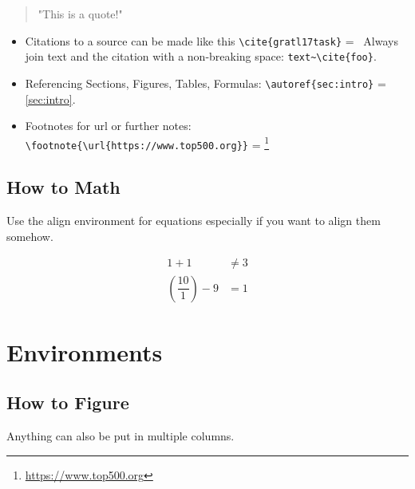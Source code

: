 \documentclass[11pt,
               a4paper,
               bibtotoc,
               idxtotoc,
               headsepline,
               footsepline,
               footexclude,
               BCOR12mm,
               DIV13,
               openany,   %
               ]
               {scrbook}
\begin{document}
\begin{quote}
    "This is a quote!"
\end{quote}

\begin{itemize}
    \item Citations to a source can be made like this \verb|\cite{gratl17task}| =~\cite{gratl17task}
    \subitem Always join text and the citation with a non-breaking space: \verb|text~\cite{foo}|.
    \item Referencing Sections, Figures, Tables, Formulas: \verb|\autoref{sec:intro}| = \autoref{sec:intro}.
    \item Footnotes for url or further notes: \verb|\footnote{\url{https://www.top500.org}}| = \footnote{\url{https://www.top500.org}}
\end{itemize}

\subsection{How to Math}

Use the align environment for equations especially if you want to align them somehow.

\begin{align}
1 + 1 &\ne 3\\
\left(\dfrac{10}{1}\right) - 9 &= 1
\end{align}

\clearpage

\section{Environments}

\subsection{How to Figure}

Anything can also be put in multiple columns.
\end{document}
